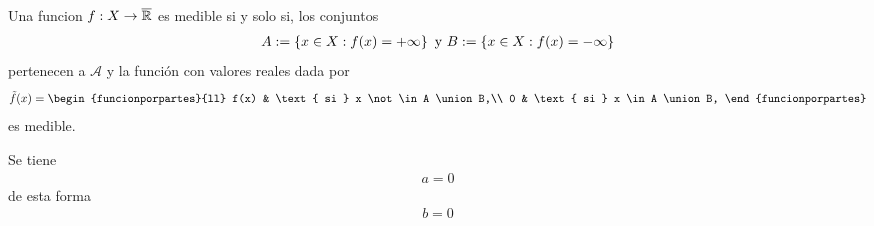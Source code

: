 \documentclass[../template.tex]{subfiles}
\begin{document}
    \begin{enunciado}
    Una funcion $f: X \rightarrow \overline{ \mathbb{R} }$ es medible si y solo si, los conjuntos
        \begin{align}
            A := \left\lbrace x \in X : f(x) = + \infty \right\rbrace \text{ y } B := \left\lbrace x \in X : f(x) = - \infty \right\rbrace
        \end{align}
    pertenecen a $\mathcal{A}$ y la función con valores reales dada por
        \begin{align}
            \tilde{f}(x) = \begin{funcionporpartes}{ll}
                                f(x) & \text{ si } x \not\in A \union B,\\
                                0 & \text{ si } x \in A \union B,
                           \end{funcionporpartes}
        \end{align}
    es medible.
    \end{enunciado}

    \begin{demostracion}
        Se tiene
            \begin{align}
                a = 0
            \end{align}
        de esta forma
            \begin{align}
                b = 0
            \end{align}

    \end{demostracion}
\end{document}
